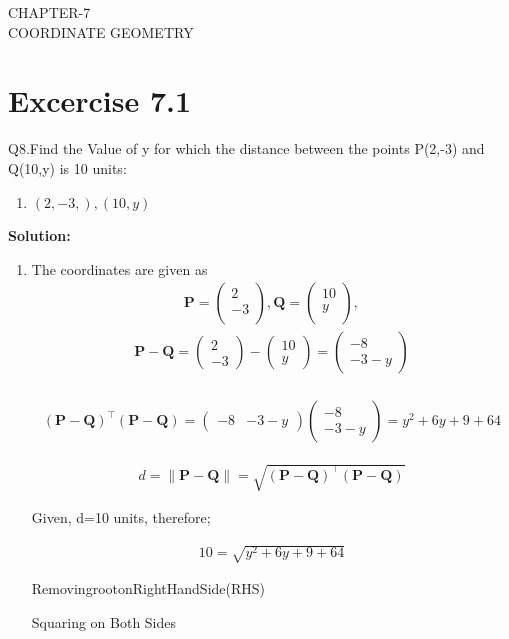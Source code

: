 \documentclass[12pt]{article}
\providecommand{\brak}[1]{\ensuremath{\left(#1\right)}}
\providecommand{\norm}[1]{\left\lVert#1\right\rVert}
\newcommand{\solution}{\noindent \textbf{Solution: }}
\newcommand{\myvec}[1]{\ensuremath{\begin{pmatrix}#1\end{pmatrix}}}
\let\vec\mathbf
\begin{document}
\begin{center}
\textbf\large{CHAPTER-7 \\ COORDINATE GEOMETRY}

\end{center}
\section*{Excercise 7.1}

Q8.Find the Value of y for which the distance between the points P(2,-3) and Q(10,y) is 10 units:
\begin{enumerate}
	\item $\brak{2,-3,}, \brak{10,y}$ 
\end{enumerate}
\solution
\begin{enumerate}
\item The coordinates are given as
	\begin{align}
	\vec{P} = \myvec{
		2\\
	   -3\\
		},
	\vec{Q} = \myvec{
	   10\\
		y\\
		},
	\end{align}
	\begin{align}
		\vec{P} - \vec{Q} = \myvec{2\\-3} - \myvec{10\\y} = \myvec{-8\\-3-y}\\		
	\end{align}
	
	
	
	
	\begin{align}
			(\vec{P}-\vec{Q})^\top (\vec{P}-\vec{Q}) = \myvec{-8&-3-y} \myvec{-8\\-3-y} = y^2+6y+9+64
	\end{align}
	
	
	\begin{align}
	d={\norm{\vec{P}-\vec{Q}}}=\sqrt{\brak{\vec{P} -\vec{Q}}^{\top}\brak{\vec{P} -\vec{Q}}}
	\end{align}
	
	
    Given, d=10 units, therefore;
    
    
	\begin{align}
	10 = \sqrt{y^2+6y+9+64}
	\end{align}
	
	
	Removing\:root\:on\:Right\:Hand\:Side(RHS)
	
	Squaring on Both Sides
	

\end{enumerate}
\end{document}
